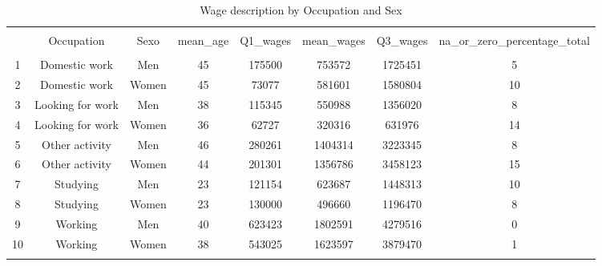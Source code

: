 \begin{table}[!htbp] \centering 
  \caption{Wage description by Occupation and Sex} 
  \label{tab:WAGES} 
\begin{tabular}{@{\extracolsep{5pt}} cccccccc} 
\\[-1.8ex]\hline 
\hline \\[-1.8ex] 
 & Occupation & Sexo & mean\_age & Q1\_wages & mean\_wages & Q3\_wages & na\_or\_zero\_percentage\_total \\ 
\hline \\[-1.8ex] 
1 & Domestic work & Men & 45 & 175500 & 753572 & 1725451 & 5 \\ 
2 & Domestic work & Women & 45 & 73077 & 581601 & 1580804 & 10 \\ 
3 & Looking for work & Men & 38 & 115345 & 550988 & 1356020 & 8 \\ 
4 & Looking for work & Women & 36 & 62727 & 320316 & 631976 & 14 \\ 
5 & Other activity & Men & 46 & 280261 & 1404314 & 3223345 & 8 \\ 
6 & Other activity & Women & 44 & 201301 & 1356786 & 3458123 & 15 \\ 
7 & Studying & Men & 23 & 121154 & 623687 & 1448313 & 10 \\ 
8 & Studying & Women & 23 & 130000 & 496660 & 1196470 & 8 \\ 
9 & Working & Men & 40 & 623423 & 1802591 & 4279516 & 0 \\ 
10 & Working & Women & 38 & 543025 & 1623597 & 3879470 & 1 \\ 
\hline \\[-1.8ex] 
\end{tabular} 
\end{table} 
